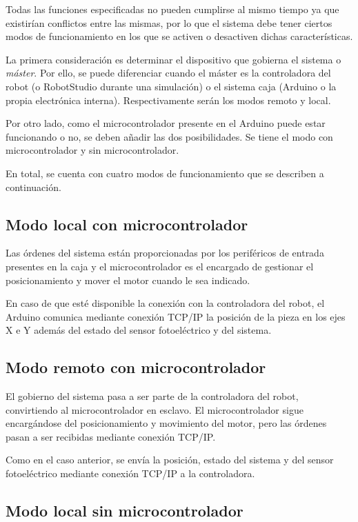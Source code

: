 Todas las funciones especificadas no pueden cumplirse al mismo tiempo ya que existirían conflictos
entre las mismas, por lo que el sistema debe tener ciertos modos de funcionamiento en los que
se activen o desactiven dichas características. 

La primera consideración es determinar el dispositivo que gobierna el sistema o \textit{máster}.
Por ello, se puede diferenciar cuando el máster es la controladora del robot (o RobotStudio durante
una simulación) o el sistema caja (Arduino o la propia electrónica interna). Respectivamente serán
los modos remoto y local.

Por otro lado, como el microcontrolador presente en el Arduino puede estar funcionando o no, se
deben añadir las dos posibilidades. Se tiene el modo con microcontrolador y sin microcontrolador.

En total, se cuenta con cuatro modos de funcionamiento que se describen a continuación.

\subsection{Modo local con microcontrolador}\label{subsec-01}

Las órdenes del sistema están proporcionadas por los periféricos de entrada presentes en la caja y
el microcontrolador es el encargado de gestionar el posicionamiento y mover el motor cuando
le sea indicado.

En caso de que esté disponible la conexión con la controladora del robot, el Arduino comunica 
mediante conexión TCP/IP la posición de la pieza en los ejes X e Y además del estado
del sensor fotoeléctrico y del sistema.

\subsection{Modo remoto con microcontrolador}\label{subsec-02}

El gobierno del sistema pasa a ser parte de la controladora del robot, convirtiendo al microcontrolador
en esclavo. El microcontrolador sigue encargándose del posicionamiento y movimiento del motor, pero las
órdenes pasan a ser recibidas mediante conexión TCP/IP.

Como en el caso anterior, se envía la posición, estado del sistema y del sensor fotoeléctrico mediante
conexión TCP/IP a la controladora.

\subsection{Modo local sin microcontrolador}\label{subsec-03}


